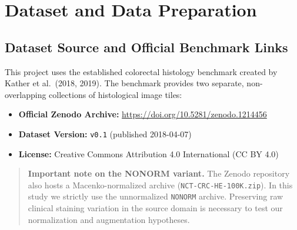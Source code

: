 \documentclass[11pt,a4paper]{article}
\begin{document}
\section{Dataset and Data Preparation}

\subsection{Dataset Source and Official Benchmark Links}
This project uses the established colorectal histology benchmark created by Kather et
al.\ (2018, 2019). The benchmark provides two separate, non-overlapping collections of
histological image tiles:

\begin{itemize}
  \item \textbf{Official Zenodo Archive:}
        \url{https://doi.org/10.5281/zenodo.1214456}
  \item \textbf{Dataset Version:} \texttt{v0.1} (published 2018-04-07)
  \item \textbf{License:} Creative Commons Attribution 4.0 International (CC BY 4.0)
\end{itemize}

\begin{table}[htbp]
\centering
\small
{}
\caption{Benchmark datasets. Both collections use $224 \times 224$ px tiles at $0.5\,\mu$m/px.}
\label{tab:datasets}
\end{table}

\begin{quote}
\textbf{Important note on the NONORM variant.} The Zenodo repository also hosts a
Macenko-normalized archive (\texttt{NCT-CRC-HE-100K.zip}). In this study we strictly
use the unnormalized \texttt{NONORM} archive. Preserving raw clinical staining
variation in the source domain is necessary to test our normalization and augmentation
hypotheses.
\end{quote}
\end{document}
